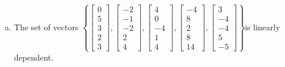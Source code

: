 \begin{exerciseAnswer}
\begin{enumerate}[(a)]
\item  The set of vectors \( \left\{ \left[\begin{array}{c}
0 \\
5 \\
3 \\
2 \\
3
\end{array}\right] , \left[\begin{array}{c}
-2 \\
-1 \\
-2 \\
2 \\
4
\end{array}\right] , \left[\begin{array}{c}
4 \\
0 \\
-4 \\
1 \\
4
\end{array}\right] , \left[\begin{array}{c}
-4 \\
8 \\
2 \\
8 \\
14
\end{array}\right] , \left[\begin{array}{c}
3 \\
-4 \\
-4 \\
5 \\
-5
\end{array}\right] \right\} \)is linearly dependent.
\end{enumerate}
    
\end{exerciseAnswer}
    
